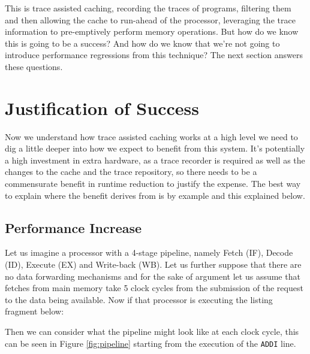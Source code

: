 This is trace assisted caching, recording the traces of programs, filtering them and then allowing the cache to run-ahead of the processor, leveraging the trace information to pre-emptively perform memory operations. But how do we know this is going to be a success? And how do we know that we're not going to introduce performance regressions from this technique? The next section answers these questions.

\section{Justification of Success}

Now we understand how trace assisted caching works at a high level we need to dig a little deeper into how we expect to benefit from this system. It's potentially a high investment in extra hardware, as a trace recorder is required as well as the changes to the cache and the trace repository, so there needs to be a commensurate benefit in runtime reduction to justify the expense. The best way to explain where the benefit derives from is by example and this explained below.

\subsection{Performance Increase}

Let us imagine a processor with a 4-stage pipeline, namely Fetch (IF), Decode (ID), Execute (EX) and Write-back (WB). Let us further suppose that there are no data forwarding mechanisms and for the sake of argument let us assume that fetches from main memory take 5 clock cycles from the submission of the request to the data being available. Now if that processor is executing the listing fragment below:



Then we can consider what the pipeline might look like at each clock cycle, this can be seen in Figure \ref{fig:pipeline} starting from the execution of the \texttt{ADDI} line.

\begin{sidewaysfigure}
	\begin{center}
		
		\caption[Pipeline Diagram - No Trace Assisted Caching]{The pipeline execution continues as normal until clock cycle 4 where the \texttt{LW} instruction enters its Execution phase. Because loading a value from main memory takes 5 clock cycles this extra latency is added not only to the \texttt{LW} but also to the \texttt{MUL} and \texttt{MV} instructions. Overall this leads to a program runtime of 14 clock cycles when the optimal time, assuming no pipeline stalls would be 8.}
		\label{fig:pipeline}
	\end{center}
\end{sidewaysfigure}

